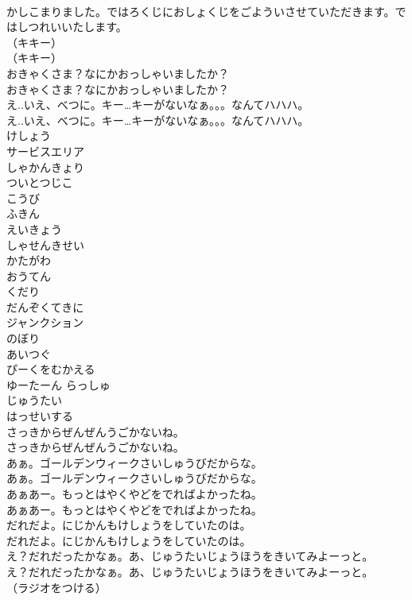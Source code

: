\documentclass[8pt]{extreport}
\begin{document}
\begin{CJK}{UTF8}{min}
\\	かしこまりました。ではろくじにおしょくじをごよういさせていただきます。ではしつれいいたします。
\\	（キキー）
\\	（キキー）
\\	おきゃくさま？なにかおっしゃいましたか？
\\	おきゃくさま？なにかおっしゃいましたか？
\\	え..いえ、べつに。キー…キーがないなぁ。。。なんてハハハ。
\\	え..いえ、べつに。キー…キーがないなぁ。。。なんてハハハ。
\\	けしょう
\\	サービスエリア
\\	しゃかんきょり
\\	ついとつじこ
\\	こうび
\\	ふきん
\\	えいきょう
\\	しゃせんきせい
\\	かたがわ
\\	おうてん
\\	くだり
\\	だんぞくてきに
\\	ジャンクション
\\	のぼり
\\	あいつぐ
\\	ぴーくをむかえる
\\	ゆーたーん らっしゅ
\\	じゅうたい
\\	はっせいする
\\	さっきからぜんぜんうごかないね。
\\	さっきからぜんぜんうごかないね。
\\	あぁ。ゴールデンウィークさいしゅうびだからな。
\\	あぁ。ゴールデンウィークさいしゅうびだからな。
\\	あぁあー。もっとはやくやどをでればよかったね。
\\	あぁあー。もっとはやくやどをでればよかったね。
\\	だれだよ。にじかんもけしょうをしていたのは。
\\	だれだよ。にじかんもけしょうをしていたのは。
\\	え？だれだったかなぁ。あ、じゅうたいじょうほうをきいてみよーっと。
\\	え？だれだったかなぁ。あ、じゅうたいじょうほうをきいてみよーっと。
\\	（ラジオをつける）

\end{CJK}
\end{document}
